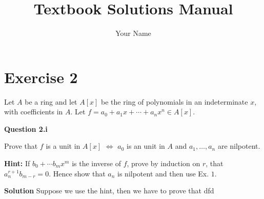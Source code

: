 \documentclass[11pt,a4paper]{amsart} %
\begin{document}
    \title{Textbook Solutions Manual}
    \author{Your Name}


    \section{Exercise 2}
    Let $A$ be a ring and let $A[x]$ be the ring of polynomials in an indeterminate $x$, with coefficients in $A$. Let $f=a_0+a_1x+\cdots+a_nx^n\in A[x]$.

    \textbf{Question 2.i}

    Prove that $f$ is a unit in $A[x]$ $\Leftrightarrow$ $a_0$ is an unit in $A$ and $a_1,\ldots,a_n$ are nilpotent.

    \textbf{Hint:} If $b_0+\cdots b_mx^m$ is the inverse of $f$, prove by induction on $r$, that $a_n^{r+1}b_{m-r}=0$. Hence show that $a_n$ is nilpotent and then use Ex. $1$.

    \textbf{Solution} Suppose we use the hint, then we have to prove that dfd
\end{document}
